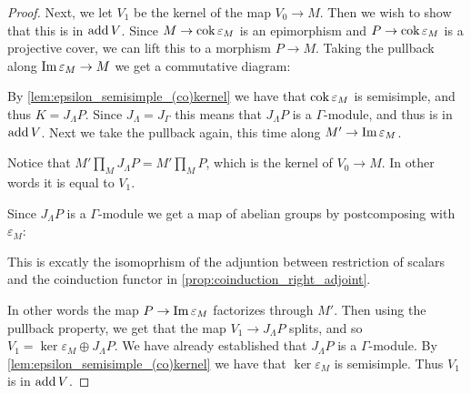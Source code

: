\begin{theorem}
\begin{proof}
		Next, we let $V_1$ be the kernel of the map $V_0 \to M$. Then we wish to show that this is in $\operatorname{add} V$. Since $M \to \operatorname{cok}\varepsilon_M$ is an epimorphism and $P \to \operatorname{cok}\varepsilon_M$ is a projective cover, we can lift this to a morphism $P \to M$. Taking the pullback along $\operatorname{Im} \varepsilon_M \to M$ we get a commutative diagram:
		\begin{center}
		\end{center} 
		By \cref{lem:epsilon_semisimple_(co)kernel} we have that $ \operatorname{cok}\varepsilon_M $ is semisimple, and thus $K = J_\Lambda P$. Since $J_\Lambda=J_\Gamma$ this means that $J_\Lambda P$ is a $\Gamma$-module, and thus is in $\operatorname{add} V$. Next we take the pullback again, this time along $M' \to \operatorname{Im} \varepsilon_M$. 
		\begin{center}
		\end{center} 
		Notice that $M'\prod\limits_M J_\Lambda P = M'\prod\limits_M P$, which is the kernel of $V_0 \to M$. In other words it is equal to $V_1$.
		
		Since $J_\Lambda P$ is a $\Gamma$-module we get a map of abelian groups by postcomposing with $\varepsilon_M$:
		\begin{center}
		\end{center} 
		This is excatly the isomoprhism of the adjuntion between restriction of scalars and the coinduction functor in \cref{prop:coinduction_right_adjoint}.

		In other words the map $P \to \operatorname{Im} \varepsilon_M$ factorizes through $M'$. Then using the pullback property, we get that the map $V_1 \to J_\Lambda P$ splits, and so $V_1 = \ker\varepsilon_M \oplus J_\Lambda P$. We have already established that $J_\Lambda P$ is a $\Gamma$-module. By \cref{lem:epsilon_semisimple_(co)kernel} we have that $\ker\varepsilon_M$ is semisimple. Thus $V_1$ is in $\operatorname{add} V$. 
		

\end{proof}
\end{theorem}
